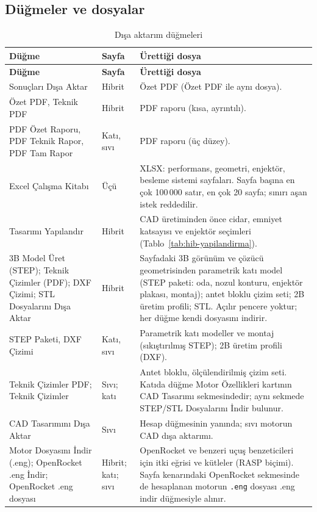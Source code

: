 \documentclass[11pt,a4paper]{article}
\newcommand{\ui}[1]{\textsf{#1}}
\newcommand{\kod}[1]{\texttt{#1}}
\begin{document}
\subsection{Düğmeler ve dosyalar}

\begin{longtable}{@{}>{\raggedright\arraybackslash}p{4.4cm}>{\raggedright\arraybackslash}p{1.8cm}>{\raggedright\arraybackslash}p{9.4cm}@{}}
\caption{Dışa aktarım düğmeleri}\label{tab:disaaktarim}\\
\toprule
\textbf{Düğme} & \textbf{Sayfa} & \textbf{Ürettiği dosya} \\
\midrule\endfirsthead
\toprule
\textbf{Düğme} & \textbf{Sayfa} & \textbf{Ürettiği dosya} \\
\midrule\endhead
\bottomrule\endlastfoot
\ui{Sonuçları Dışa Aktar} & Hibrit & Özet PDF (\ui{Özet PDF} ile aynı dosya). \\
\ui{Özet PDF}, \ui{Teknik PDF} & Hibrit & PDF raporu (kısa, ayrıntılı). \\
\ui{PDF Özet Raporu}, \ui{PDF Teknik Rapor}, \ui{PDF Tam Rapor} & Katı, sıvı & PDF raporu (üç düzey). \\
\ui{Excel Çalışma Kitabı} & Üçü & XLSX: performans, geometri, enjektör, besleme sistemi sayfaları. Sayfa başına en çok 100\,000 satır, en çok 20 sayfa; sınırı aşan istek reddedilir. \\
\ui{Tasarımı Yapılandır} & Hibrit & CAD üretiminden önce cidar, emniyet katsayısı ve enjektör seçimleri (Tablo~\ref{tab:hib-yapilandirma}). \\
\ui{3B Model Üret (STEP)}; \ui{Teknik Çizimler (PDF)}; \ui{DXF Çizimi}; \ui{STL Dosyalarını Dışa Aktar} & Hibrit & Sayfadaki 3B görünüm ve çözücü geometrisinden parametrik katı model (STEP paketi: oda, nozul konturu, enjektör plakası, montaj); antet bloklu çizim seti; 2B üretim profili; STL. Açılır pencere yoktur; her düğme kendi dosyasını indirir. \\
\ui{STEP Paketi}, \ui{DXF Çizimi} & Katı, sıvı & Parametrik katı modeller ve montaj (sıkıştırılmış STEP); 2B üretim profili (DXF). \\
\ui{Teknik Çizimler PDF}; \ui{Teknik Çizimler} & Sıvı; katı & Antet bloklu, ölçülendirilmiş çizim seti. Katıda düğme \ui{Motor Özellikleri} kartının \ui{CAD Tasarımı} sekmesindedir; aynı sekmede \ui{STEP/STL Dosyalarını İndir} bulunur. \\
\ui{CAD Tasarımını Dışa Aktar} & Sıvı & Hesap düğmesinin yanında; sıvı motorun CAD dışa aktarımı. \\
\ui{Motor Dosyasını İndir (.eng)}; \ui{OpenRocket .eng İndir}; \ui{OpenRocket .eng dosyası} & Hibrit; katı; sıvı & OpenRocket ve benzeri uçuş benzeticileri için itki eğrisi ve kütleler (RASP biçimi). Sayfa kenarındaki \ui{OpenRocket} sekmesinde de hesaplanan motorun \kod{.eng} dosyası \ui{.eng indir} düğmesiyle alınır. \\

\end{longtable}
\end{document}
